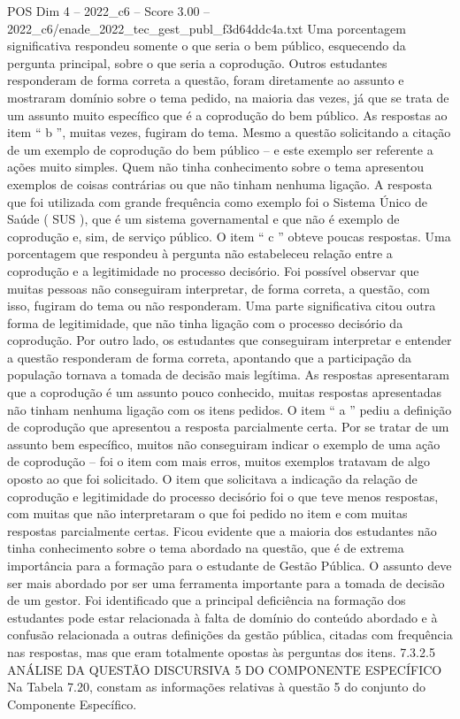 \begin{textsample}{POS Dim 4 – 2022\_c6 – Score 3.00 – 2022\_c6/enade\_2022\_tec\_gest\_publ\_f3d64ddc4a.txt}
Uma porcentagem significativa respondeu somente o que seria o bem público, esquecendo da pergunta principal, sobre o que seria a coprodução.
Outros estudantes responderam de forma correta a questão, foram diretamente ao assunto e mostraram domínio sobre o tema pedido, na maioria das vezes, já que se trata de um assunto muito específico que é a coprodução do bem público.
As respostas ao item “ b ”, muitas vezes, fugiram do tema.
Mesmo a questão solicitando a citação de um exemplo de coprodução do bem público – e este exemplo ser referente a ações muito simples.
Quem não tinha conhecimento sobre o tema apresentou exemplos de coisas contrárias ou que não tinham nenhuma ligação.
A resposta que foi utilizada com grande frequência como exemplo foi o Sistema Único de Saúde ( SUS ), que é um sistema governamental e que não é exemplo de coprodução e, sim, de serviço público.
O item “ c ” obteve poucas respostas.
Uma porcentagem que respondeu à pergunta não estabeleceu relação entre a coprodução e a legitimidade no processo decisório.
Foi possível observar que muitas pessoas não conseguiram interpretar, de forma correta, a questão, com isso, fugiram do tema ou não responderam.
Uma parte significativa citou outra forma de legitimidade, que não tinha ligação com o processo decisório da coprodução.
Por outro lado, os estudantes que conseguiram interpretar e entender a questão responderam de forma correta, apontando que a participação da população tornava a tomada de decisão mais legítima.
As respostas apresentaram que a coprodução é um assunto pouco conhecido, muitas respostas apresentadas não tinham nenhuma ligação com os itens pedidos.
O item “ a ” pediu a definição de coprodução que apresentou a resposta parcialmente certa.
Por se tratar de um assunto bem específico, muitos não conseguiram indicar o exemplo de uma ação de coprodução – foi o item com mais erros, muitos exemplos tratavam de algo oposto ao que foi solicitado.
O item que solicitava a indicação da relação de coprodução e legitimidade do processo decisório foi o que teve menos respostas, com muitas que não interpretaram o que foi pedido no item e com muitas respostas parcialmente certas.
Ficou evidente que a maioria dos estudantes não tinha conhecimento sobre o tema abordado na questão, que é de extrema importância para a formação para o estudante de Gestão Pública.
O assunto deve ser mais abordado por ser uma ferramenta importante para a tomada de decisão de um gestor.
Foi identificado que a principal deficiência na formação dos estudantes pode estar relacionada à falta de domínio do conteúdo abordado e à confusão relacionada a outras definições da gestão pública, citadas com frequência nas respostas, mas que eram totalmente opostas às perguntas dos itens. 7.3.2.5 ANÁLISE DA QUESTÃO DISCURSIVA 5 DO COMPONENTE ESPECÍFICO Na Tabela 7.20, constam as informações relativas à questão 5 do conjunto do Componente Específico.

\end{textsample}
